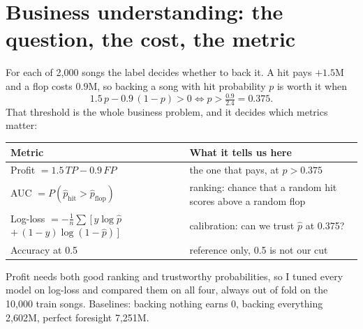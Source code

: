 \documentclass[10pt,a4paper,twocolumn]{extarticle}
\begin{document}

\section{Business understanding: the question, the cost, the metric}
For each of 2{,}000 songs the label decides whether to back it. A hit pays $+1.5$M and a
flop costs $0.9$M, so backing a song with hit probability $p$ is worth it when
\[
1.5\,p - 0.9\,(1-p) > 0 \iff p > \tfrac{0.9}{2.4} = 0.375 .
\]
That threshold is the whole business problem, and it decides which metrics matter:
\begin{center}\footnotesize
\begin{tabular}{@{}p{}p{}@{}}
\toprule
Metric & What it tells us here \\
\midrule
Profit $=1.5\,TP-0.9\,FP$ & the one that pays, at $p>0.375$ \\
AUC $=P(\hat p_{\text{hit}}>\hat p_{\text{flop}})$ & ranking: chance that a random hit scores above a random flop \\
Log-loss $=-\frac1n\sum\,[\,y\log\hat p$ \newline \hspace*{1.2em}$+\,(1-y)\log(1-\hat p)\,]$ & calibration: can we trust $\hat p$ at 0.375? \\
Accuracy at 0.5 & reference only, 0.5 is not our cut \\
\bottomrule
\end{tabular}
\end{center}
Profit needs both good ranking and trustworthy probabilities, so I tuned every model on
log-loss and compared them on all four, always out of fold on the 10{,}000 train songs.
Baselines: backing nothing earns 0, backing everything 2{,}602M, perfect foresight 7{,}251M.
\end{document}
